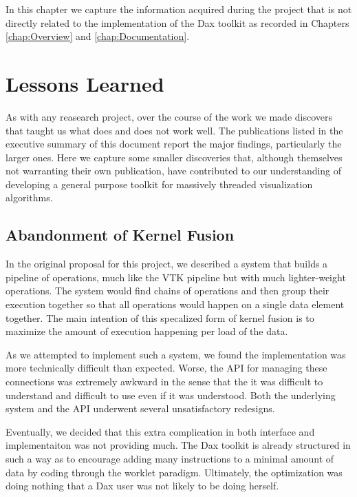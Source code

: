 
In this chapter we capture the information acquired during the project that
is not directly related to the implementation of the Dax toolkit as
recorded in Chapters \ref{chap:Overview} and \ref{chap:Documentation}.

\section{Lessons Learned}

As with any reasearch project, over the course of the work we made
discovers that taught us what does and does not work well. The publications
listed in the executive summary of this document report the major findings,
particularly the larger ones. Here we capture some smaller discoveries
that, although themselves not warranting their own publication, have
contributed to our understanding of developing a general purpose toolkit
for massively threaded visualization algorithms.

\subsection{Abandonment of Kernel Fusion}

In the original proposal for this project, we described a system that
builds a pipeline of operations, much like the VTK pipeline but with much
lighter-weight operations. The system would find chains of operations and
then group their execution together so that all operations would happen on
a single data element together. The main intention of this specalized form
of kernel fusion is to maximize the amount of execution happening per load
of the data.

As we attempted to implement such a system, we found the implementation was
more technically difficult than expected. Worse, the API for managing these
connections was extremely awkward in the sense that the it was difficult to
understand and difficult to use even if it was understood. Both the
underlying system and the API underwent several unsatisfactory redesigns.

Eventually, we decided that this extra complication in both interface and
implementaiton was not providing much. The Dax toolkit is already
structured in such a way as to encourage adding many instructions to a
minimal amount of data by coding through the worklet paradigm. Ultimately,
the optimization was doing nothing that a Dax user was not likely to be
doing herself.

